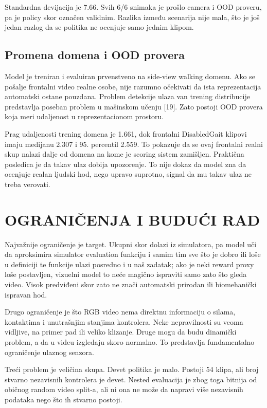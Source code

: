 \documentclass[12pt,a4paper]{report}
\begin{document}
Standardna devijacija je 7.66. Svih 6/6 snimaka je prošlo camera i OOD proveru,
pa je policy skor označen validnim. Razlika između scenarija nije mala, što je
još jedan razlog da se politika ne ocenjuje samo jednim klipom.

\section{Promena domena i OOD provera}

Model je treniran i evaluiran prvenstveno na side-view walking domenu. Ako se
pošalje frontalni video realne osobe, nije razumno očekivati da ista
reprezentacija automatski ostane pouzdana. Problem detekcije ulaza van trening
distribucije predstavlja poseban problem u mašinskom učenju [19]. Zato postoji OOD
provera koja meri udaljenost u reprezentacionom prostoru.

Prag udaljenosti trening domena je 1.661, dok frontalni DisabledGait klipovi
imaju medijanu 2.307 i 95. percentil 2.559. To pokazuje da se ovaj frontalni
realni skup nalazi dalje od domena na kome je scoring sistem zamišljen.
Praktična posledica je da takav ulaz dobija upozorenje. To nije dokaz da model
zna da ocenjuje realan ljudski hod, nego upravo suprotno, signal da mu takav
ulaz ne treba verovati.

\chapter{OGRANIČENJA I BUDUĆI RAD}

Najvažnije ograničenje je target. Ukupni skor dolazi iz simulatora, pa model
uči da aproksimira simulator evaluation funkciju i samim tim sve što je dobro ili
loše u definiciji te funkcije ulazi posredno i u naš zadatak; ako je neki reward
proxy loše postavljen, vizuelni model to neće magično ispraviti samo zato što
gleda video. Visok predviđeni skor zato ne znači automatski prirodan ili
biomehanički ispravan hod.

Drugo ograničenje je što RGB video nema direktnu informaciju o silama,
kontaktima i unutrašnjim stanjima kontrolera. Neke nepravilnosti su veoma
vidljive, na primer pad ili veliko klizanje. Druge mogu da budu dinamički
problem, a da u videu izgledaju skoro normalno. To predstavlja fundamentalno
ograničenje ulaznog senzora.

Treći problem je veličina skupa. Devet politika je malo. Postoji 54 klipa, ali
broj stvarno nezavisnih kontrolera je devet. Nested evaluacija je zbog toga
bitnija od običnog random video split-a, ali ni ona ne može da napravi više
nezavisnih podataka nego što ih stvarno postoji.
\end{document}
